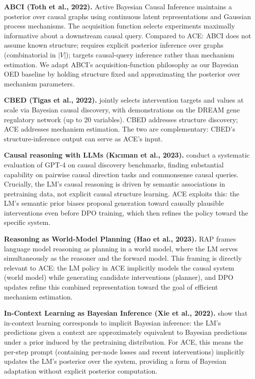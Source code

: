 \documentclass[twoside]{article}
\theoremstyle{plain}
\theoremstyle{definition}
\theoremstyle{remark}
\begin{document}
\textbf{ABCI (Toth et al., 2022).} Active Bayesian Causal Inference \citep{toth2022active} maintains a posterior over causal graphs using continuous latent representations and Gaussian process mechanisms. The acquisition function selects experiments maximally informative about a downstream causal query. Compared to ACE: ABCI does not assume known structure; requires explicit posterior inference over graphs (combinatorial in $|V|$); targets causal-query inference rather than mechanism estimation. We adapt ABCI's acquisition-function philosophy as our Bayesian OED baseline by holding structure fixed and approximating the posterior over mechanism parameters.

\textbf{CBED (Tigas et al., 2022).} \citep{tigas2022interventions} jointly selects intervention targets and values at scale via Bayesian causal discovery, with demonstrations on the DREAM gene regulatory network (up to 20 variables). CBED addresses structure discovery; ACE addresses mechanism estimation. The two are complementary: CBED's structure-inference output can serve as ACE's input.

\textbf{Causal reasoning with LLMs (K\i{}c\i{}man et al., 2023).} \citet{kiciman2023causal} conduct a systematic evaluation of GPT-4 on causal discovery benchmarks, finding substantial capability on pairwise causal direction tasks and commonsense causal queries. Crucially, the LM's causal reasoning is driven by semantic associations in pretraining data, not explicit causal structure learning. ACE exploits this: the LM's semantic prior biases proposal generation toward causally plausible interventions even before DPO training, which then refines the policy toward the specific system.

\textbf{Reasoning as World-Model Planning (Hao et al., 2023).} RAP \citep{hao2023reasoning} frames language model reasoning as planning in a world model, where the LM serves simultaneously as the reasoner and the forward model. This framing is directly relevant to ACE: the LM policy in ACE implicitly models the causal system (world model) while generating candidate interventions (planner), and DPO updates refine this combined representation toward the goal of efficient mechanism estimation.

\textbf{In-Context Learning as Bayesian Inference (Xie et al., 2022).} \citet{xie2022explanation} show that in-context learning corresponds to implicit Bayesian inference: the LM's predictions given a context are approximately equivalent to Bayesian predictions under a prior induced by the pretraining distribution. For ACE, this means the per-step prompt (containing per-node losses and recent interventions) implicitly updates the LM's posterior over the system, providing a form of Bayesian adaptation without explicit posterior computation.
\end{document}
